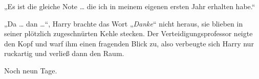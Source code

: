 „Es ist die gleiche Note … die ich in meinem eigenen ersten Jahr erhalten habe.“

„Da … dan …“,
Harry brachte das Wort
„\emph{Danke}“ nicht heraus, sie blieben in seiner plötzlich zugeschnürten Kehle stecken.
Der Verteidigungsprofessor neigte den Kopf und warf ihm einen fragenden Blick zu, also verbeugte sich Harry nur ruckartig und verließ dann den Raum.

Noch neun Tage.

